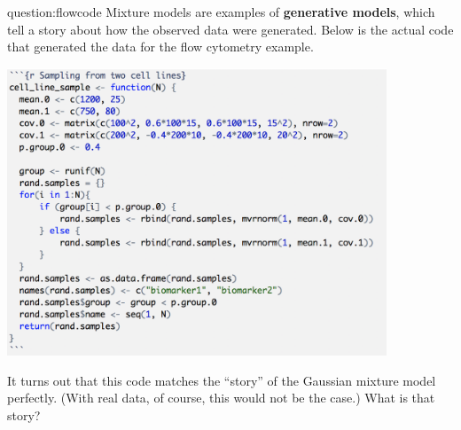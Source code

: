 \begin{question}{question:flowcode}
Mixture models are examples of \textbf{generative models}, which tell a story about how the observed data were generated. Below is the actual code that generated the data for the flow cytometry example.
\begin{center}
\includegraphics[width=0.85\textwidth]{img/biomarker-code.png}
\end{center}
It turns out that this code matches the ``story'' of the Gaussian mixture model perfectly. (With real data, of course, this would not be the case.) What is that story?
\end{question}

